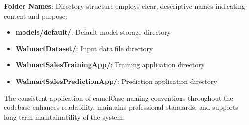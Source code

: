 \textbf{Folder Names}: Directory structure employs clear, descriptive names indicating content and purpose:
\begin{itemize}
	\item \textbf{models/default/}: Default model storage directory
	\item \textbf{WalmartDataset/}: Input data file directory
	\item \textbf{WalmartSalesTrainingApp/}: Training application directory
	\item \textbf{WalmartSalesPredictionApp/}: Prediction application directory
\end{itemize}

The consistent application of camelCase naming conventions throughout the codebase enhances readability, maintains professional standards, and supports long-term maintainability of the system.